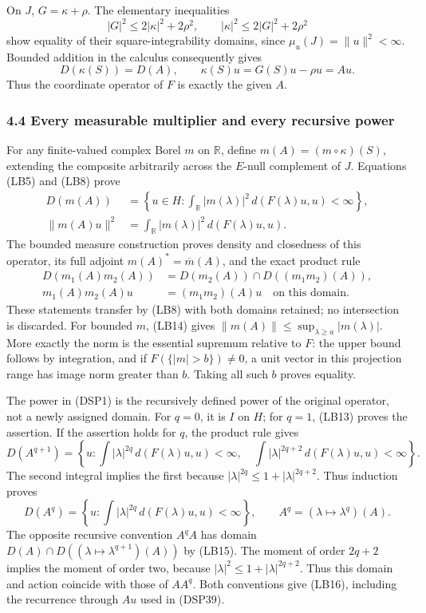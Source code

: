 \documentclass[
  11pt,
]{article}
\begin{document}
On \(J\), \(G=\kappa+\rho\). The elementary inequalities \[
 |G|^2\leq2|\kappa|^2+2\rho^2,\qquad
 |\kappa|^2\leq2|G|^2+2\rho^2
 \tag{LB12}
\] show equality of their square-integrability domains, since
\(\mu_u(J)=\|u\|^2<\infty\). Bounded addition in the calculus
consequently gives \[
 D(\kappa(S))=D(A),\qquad
 \kappa(S)u=G(S)u-\rho u=Au.
 \tag{LB13}
\] Thus the coordinate operator of \(F\) is exactly the given \(A\).

\subsubsection{4.4 Every measurable multiplier and every recursive
power}\label{every-measurable-multiplier-and-every-recursive-power}

For any finite-valued complex Borel \(m\) on \(\mathbb R\), define
\(m(A)=(m\circ\kappa)(S)\), extending the composite arbitrarily across
the \(E\)-null complement of \(J\). Equations (LB5) and (LB8) prove \[
 \begin{aligned}
 D(m(A))&=\left\{u\in H:
       \int_{\mathbb R}|m(\lambda)|^2\,d(F(\lambda)u,u)<\infty\right\},\\
 \|m(A)u\|^2&=\int_{\mathbb R}|m(\lambda)|^2\,d(F(\lambda)u,u).
 \end{aligned}
 \tag{LB14}
\] The bounded measure construction proves density and closedness of
this operator, its full adjoint \(m(A)^*=\overline m(A)\), and the exact
product rule \[
 \begin{aligned}
 D(m_1(A)m_2(A))
   &=D(m_2(A))\cap D((m_1m_2)(A)),\\
 m_1(A)m_2(A)u&=(m_1m_2)(A)u
       \quad\text{on this domain}.
 \end{aligned}
 \tag{LB15}
\] These statements transfer by (LB8) with both domains retained; no
intersection is discarded. For bounded \(m\), (LB14) gives
\(\|m(A)\|\leq\sup_{\lambda\geq a}|m(\lambda)|\). More exactly the norm
is the essential supremum relative to \(F\): the upper bound follows by
integration, and if \(F(\{|m|>b\})\ne0\), a unit vector in this
projection range has image norm greater than \(b\). Taking all such
\(b\) proves equality.

The power in (DSP1) is the recursively defined power of the original
operator, not a newly assigned domain. For \(q=0\), it is \(I\) on
\(H\); for \(q=1\), (LB13) proves the assertion. If the assertion holds
for \(q\), the product rule gives \[
 D(A^{q+1})
 =\left\{u:
 \int |\lambda|^{2q}\,d(F(\lambda)u,u)<\infty,\quad
 \int |\lambda|^{2q+2}\,d(F(\lambda)u,u)<\infty\right\}.
\] The second integral implies the first because
\(|\lambda|^{2q}\leq1+|\lambda|^{2q+2}\). Thus induction proves \[
 D(A^q)=\left\{u:
       \int|\lambda|^{2q}\,d(F(\lambda)u,u)<\infty\right\},
 \qquad A^q=(\lambda\mapsto\lambda^q)(A).
 \tag{LB16}
\] The opposite recursive convention \(A^qA\) has domain
\(D(A)\cap D((\lambda\mapsto\lambda^{q+1})(A))\) by (LB15). The moment
of order \(2q+2\) implies the moment of order two, because
\(|\lambda|^2\leq1+|\lambda|^{2q+2}\). Thus this domain and action
coincide with those of \(AA^q\). Both conventions give (LB16), including
the recurrence through \(Au\) used in (DSP39).
\end{document}
